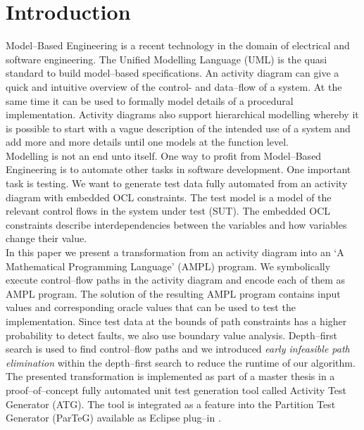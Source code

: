 \documentclass[runningheads,a4paper]{llncs}%
\begin{document}
\section{Introduction}%
Model--Based Engineering is a recent technology in the domain of electrical and software engineering. The Unified Modelling Language\textsuperscript{\texttrademark} (UML) is the quasi standard to build model--based specifications. 
An activity diagram can give a quick and intuitive overview of the control- and data--flow of a system. At the same time it can be used to formally model details of a procedural implementation. Activity diagrams also support hierarchical modelling whereby it is possible to start with a vague description of the intended use of a system and add more and more details until one models at the function level.\\
Modelling is not an end unto itself. One way to profit from Model--Based Engineering is to automate other tasks in software development. One important task is testing. We want to generate test data fully automated from an activity diagram with embedded OCL constraints. The test model is a model of the relevant control flows in the system under test (SUT). The embedded OCL constraints describe interdependencies between the variables and how variables change their value.\\
In this paper we present a transformation from an activity diagram into an `A Mathematical Programming Language' (AMPL) program. We symbolically execute control--flow paths in the activity diagram and encode each of them as AMPL program. The solution of the resulting AMPL program contains input values and corresponding oracle values that can be used to test the implementation. Since test data at the bounds of path constraints has a higher probability to detect faults, we also use boundary value analysis. Depth--first search is used to find control--flow paths and we introduced \emph{early infeasible path elimination} within the depth--first search to reduce the runtime of our algorithm. The presented transformation is implemented as part of a master thesis \cite{Kurth2014AutomatedGen} in a proof--of--concept fully automated unit test generation tool called Activity Test Generator (ATG). The tool is integrated as a feature into the Partition Test Generator (ParTeG) available as Eclipse plug--in \cite{PartegWebsite}.\\%
\end{document}
